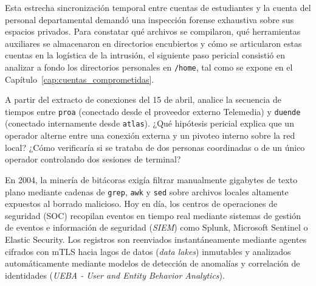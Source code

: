 Esta estrecha sincronización temporal entre cuentas de estudiantes y la cuenta del personal departamental demandó una inspección forense exhaustiva sobre sus espacios privados. Para constatar qué archivos se compilaron, qué herramientas auxiliares se almacenaron en directorios encubiertos y cómo se articularon estas cuentas en la logística de la intrusión, el siguiente paso pericial consistió en analizar a fondo los directorios personales en \texttt{/home}, tal como se expone en el Capítulo~\ref{cap:cuentas_comprometidas}.

\begin{retoforense}
A partir del extracto de conexiones del 15 de abril, analice la secuencia de tiempos entre \texttt{proa} (conectado desde el proveedor externo Telemedia) y \texttt{duende} (conectado internamente desde \texttt{atlas}). ¿Qué hipótesis pericial explica que un operador alterne entre una conexión externa y un pivoteo interno sobre la red local? ¿Cómo verificaría si se trataba de dos personas coordinadas o de un único operador controlando dos sesiones de terminal?
\end{retoforense}

\begin{perspectiva20}
En 2004, la minería de bitácoras exigía filtrar manualmente gigabytes de texto plano mediante cadenas de \texttt{grep}, \texttt{awk} y \texttt{sed} sobre archivos locales altamente expuestos al borrado malicioso. Hoy en día, los centros de operaciones de seguridad (SOC) recopilan eventos en tiempo real mediante sistemas de gestión de eventos e información de seguridad (\textit{SIEM}) como Splunk, Microsoft Sentinel o Elastic Security. Los registros son reenviados instantáneamente mediante agentes cifrados con mTLS hacia lagos de datos (\textit{data lakes}) inmutables y analizados automáticamente mediante modelos de detección de anomalías y correlación de identidades (\textit{UEBA - User and Entity Behavior Analytics}).
\end{perspectiva20}


